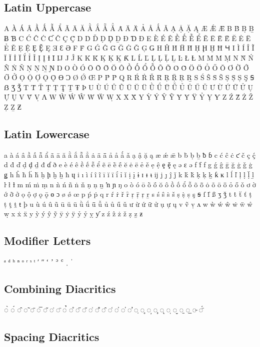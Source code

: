 
\subsection{Latin Uppercase}

A À Á Â Ầ Ấ Ẫ Ẩ Ã Ā Ă Ằ Ắ Ẵ Ẳ Ȧ Ä Ǟ Ả Å Ǻ Ǎ Ạ Ậ Ặ Ą Æ Ǽ Ǣ B Ḃ Ḅ Ḇ Ƀ Ɓ C Ć Ĉ Ċ Ƈ Č Ç Ḉ D Ḋ Ď Ḍ Ḑ Ḏ Đ Ɗ Ð E È É Ê Ề Ế Ễ Ể Ẽ Ē Ḕ Ḗ Ĕ Ė Ë Ẻ Ě Ẹ Ệ Ȩ Ḝ Ę Ǝ Ɛ Ə F Ḟ G Ǵ Ĝ Ḡ Ğ Ġ Ǧ Ģ Ǥ H Ĥ Ḣ Ḧ Ȟ Ḥ Ḩ Ḫ Ħ Ɥ I Ì Í Î Ĩ Ī Ĭ İ Ï Ḯ Ỉ Ǐ Ị Į Ɨ Ɪ Ĳ J Ĵ K Ḱ Ǩ Ḳ Ķ Ḵ Ƙ L Ĺ Ľ Ļ Ḷ Ḹ Ḻ Ŀ Ł Ƚ M Ḿ Ṁ Ṃ N Ǹ Ń Ñ Ṅ Ň Ṇ Ņ Ṉ Ɲ Ŋ O Ò Ó Ō Ṑ Ṓ Ŏ Ô Ồ Ố Ổ Ỗ Õ Ȭ Ȯ Ȱ Ö Ȫ Ỏ Ő Ǒ Ơ Ờ Ớ Ỡ Ở Ọ Ộ Ợ Ǫ Ǭ Ɵ Ɔ Ø Ǿ Œ P Ṕ Ṗ Q R Ŕ Ṙ Ř Ȓ Ṛ Ṝ Ŗ Ṟ S Ś Ŝ Ṡ Š Ṣ Ṩ Ș Ş Ꞩ ẞ Ʒ Ǯ T Ṫ Ť Ṭ Ț Ţ Ṯ Ŧ Þ U Ù Ú Û Ũ Ū Ŭ Ü Ǜ Ǘ Ǖ Ǚ Ủ Ů Ű Ǔ Ư Ừ Ứ Ữ Ử Ụ Ự Ų V Ṽ Ṿ Ʌ W Ẁ Ẃ Ŵ Ẇ Ẅ Ẉ X Ẋ Ẍ Y Ỳ Ý Ŷ Ỹ Ȳ Ẏ Ÿ Ỷ Ỵ Ƴ Z Ź Ẑ Ż Ž Ẓ Ẕ Ƶ

\subsection{Latin Lowercase}

a à á â ầ ấ ẫ ẩ ã ā ă ằ ắ ẵ ẳ ȧ ä ǟ ả å ǻ ǎ ạ ậ ặ ą æ ǽ ǣ b ḃ ḅ ḇ ƀ ɓ c ć ĉ ċ ƈ č ç ḉ d ḋ ď ḍ ḑ ḏ đ ɗ ð e è é ê ề ế ễ ể ẽ ē ḕ ḗ ĕ ė ë ẻ ě ẹ ệ ȩ ḝ ę ǝ ɛ ə f ḟ ƒ g ǵ ĝ ḡ ğ ġ ǧ ģ ǥ h ĥ ḣ ḧ ȟ ḥ ḩ ḫ ẖ ħ ɥ i ı ì í î ĩ ī ĭ ï ḯ ỉ ǐ ị į ɨ ɪ ᵻ ᵼ ĳ j ȷ ĵ ǰ k ḱ ǩ ḳ ķ ḵ ƙ ĸ l ĺ ľ ļ ḷ ḹ ḻ ŀ ł ƚ m ḿ ṁ ṃ n ǹ ń ñ ṅ ň ṇ ņ ṉ ŉ ɲ ŋ o ò ó ō ṑ ṓ ŏ ô ồ ố ổ ỗ õ ȭ ȯ ȱ ö ȫ ỏ ő ǒ ơ ờ ớ ỡ ở ọ ộ ợ ǫ ǭ ɵ ɔ ø ǿ œ p ṕ ṗ q r ŕ ṙ ř ȓ ṛ ṝ ŗ ṟ s ś ŝ ṡ š ṣ ṩ ș ş ꞩ ſ ẛ ß ʒ ǯ t ṫ ẗ ť ṭ ț ţ ṯ ŧ þ u ù ú û ũ ū ŭ ü ǜ ǘ ǖ ǚ ủ ů ű ǔ ư ừ ứ ữ ử ụ ự ų v ṽ ṿ ʌ w ẁ ẃ ŵ ẇ ẅ ẘ ẉ x ẋ ẍ y ỳ ý ŷ ỹ ȳ ẏ ÿ ỷ ẙ ỵ ƴ z ź ẑ ż ž ẓ ẕ ƶ

\subsection{Modifier Letters}

ᵃ ᵈ ʰ ⁿ ᵒ ʳ ˢ ᵗ ʹ ʺ ʻ ʼ ʾ ʿ ˌ ˈ

\subsection{Combining Diacritics}

◌̀ ◌́ ◌̂ ◌̃ ◌̄ ◌̅ ◌̆ ◌̇ ◌̈ ◌̉ ◌̊ ◌̋ ◌̌ ◌̍ ◌̐ ◌̑ ◌̒ ◌̓ ◌̕ ◌̛ ◌̣ ◌̥ ◌̦ ◌̧ ◌̨ ◌̩ ◌̮ ◌̱ ◌̲ ◌̵ ◌̈́

\subsection{Spacing Diacritics}

